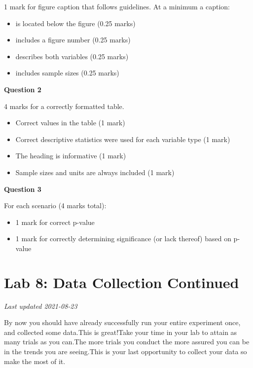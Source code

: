 \documentclass[
]{book}
\providecommand{\tightlist}{%
  \setlength{\itemsep}{0pt}\setlength{\parskip}{0pt}}
\begin{document}
1 mark for figure caption that follows guidelines. At a minimum a caption:

\begin{itemize}
\tightlist
\item
  is located below the figure (0.25 marks)
\item
  includes a figure number (0.25 marks)
\item
  describes both variables (0.25 marks)
\item
  includes sample sizes (0.25 marks)
\end{itemize}

\textbf{Question 2}

4 marks for a correctly formatted table.

\begin{itemize}
\tightlist
\item
  Correct values in the table (1 mark)
\item
  Correct descriptive statistics were used for each variable type (1 mark)
\item
  The heading is informative (1 mark)
\item
  Sample sizes and units are always included (1 mark)
\end{itemize}

\textbf{Question 3}

For each scenario (4 marks total):

\begin{itemize}
\tightlist
\item
  1 mark for correct p-value
\item
  1 mark for correctly determining significance (or lack thereof) based on p-value
\end{itemize}

\hypertarget{lab-8-data-collection-continued}{%
\chapter*{Lab 8: Data Collection Continued}\label{lab-8-data-collection-continued}}

\emph{Last updated 2021-08-23}

By now you should have already successfully run your entire experiment once, and collected some data.This is great!Take your time in your lab to attain as many trials as you can.The more trials you conduct the more assured you can be in the trends you are seeing.This is your last opportunity to collect your data so make the most of it.
\end{document}
